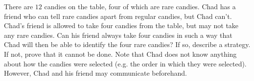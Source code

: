 There are $12$ candies on the table, four of which are rare candies. Chad has a friend who can tell rare candies apart from regular candies, but Chad can’t. Chad’s friend is allowed to take four candies from the table, but may not take any rare candies. Can his friend always take four candies in such a way that Chad will then be able to identify the four rare candies? If so, describe a strategy. If not, prove that it cannot be done.
Note that Chad does not know anything about how the candies were selected (e.g. the order in which they were selected). However, Chad and his friend may communicate beforehand.